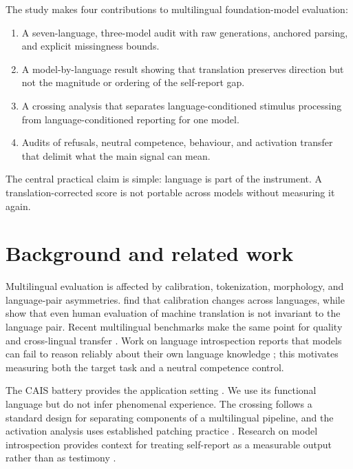 \documentclass{article}
\begin{document}
The study makes four contributions to multilingual foundation-model evaluation:
\begin{enumerate}
    \item A seven-language, three-model audit with raw generations, anchored parsing, and explicit missingness bounds.
    \item A model-by-language result showing that translation preserves direction but not the magnitude or ordering of the self-report gap.
    \item A crossing analysis that separates language-conditioned stimulus processing from language-conditioned reporting for one model.
    \item Audits of refusals, neutral competence, behaviour, and activation transfer that delimit what the main signal can mean.
\end{enumerate}

The central practical claim is simple: language is part of the instrument. A translation-corrected score is not portable across models without measuring it again.

\section{Background and related work}

Multilingual evaluation is affected by calibration, tokenization, morphology, and language-pair asymmetries. \citet{ahuja2022} find that calibration changes across languages, while \citet{licht2022} show that even human evaluation of machine translation is not invariant to the language pair. Recent multilingual benchmarks make the same point for quality and cross-lingual transfer \citep{liu2026}. Work on language introspection reports that models can fail to reason reliably about their own language knowledge \citep{song2025}; this motivates measuring both the target task and a neutral competence control.

The CAIS battery provides the application setting \citep{ren2026}. We use its functional language but do not infer phenomenal experience. The crossing follows a standard design for separating components of a multilingual pipeline, and the activation analysis uses established patching practice \citep{zhang2023}. Research on model introspection provides context for treating self-report as a measurable output rather than as testimony \citep{binder2024}.




\end{document}
